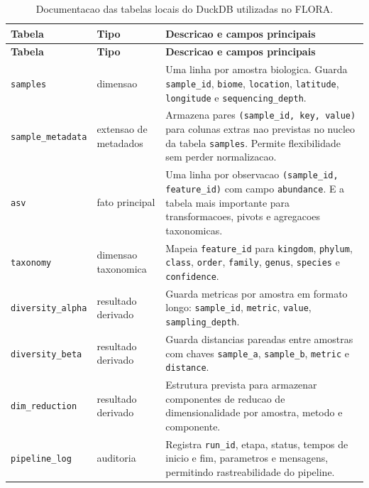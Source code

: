 \documentclass[12pt,a4paper]{article}
\begin{document}
\begin{longtable}{>{\raggedright\arraybackslash}p{3.2cm} >{\raggedright\arraybackslash}p{3.0cm} >{\raggedright\arraybackslash}p{7.8cm}}
    \caption{Documentacao das tabelas locais do DuckDB utilizadas no FLORA.}
    \label{tab:duckdb_tables}\\
    \toprule
    \textbf{Tabela} & \textbf{Tipo} & \textbf{Descricao e campos principais} \\
    \midrule
    \endfirsthead
    \toprule
    \textbf{Tabela} & \textbf{Tipo} & \textbf{Descricao e campos principais} \\
    \midrule
    \endhead
    \texttt{samples} & dimensao & Uma linha por amostra biologica. Guarda \texttt{sample\_id}, \texttt{biome}, \texttt{location}, \texttt{latitude}, \texttt{longitude} e \texttt{sequencing\_depth}. \\
    \texttt{sample\_metadata} & extensao de metadados & Armazena pares \texttt{(sample\_id, key, value)} para colunas extras nao previstas no nucleo da tabela \texttt{samples}. Permite flexibilidade sem perder normalizacao. \\
    \texttt{asv} & fato principal & Uma linha por observacao \texttt{(sample\_id, feature\_id)} com campo \texttt{abundance}. E a tabela mais importante para transformacoes, pivots e agregacoes taxonomicas. \\
    \texttt{taxonomy} & dimensao taxonomica & Mapeia \texttt{feature\_id} para \texttt{kingdom}, \texttt{phylum}, \texttt{class}, \texttt{order}, \texttt{family}, \texttt{genus}, \texttt{species} e \texttt{confidence}. \\
    \texttt{diversity\_alpha} & resultado derivado & Guarda metricas por amostra em formato longo: \texttt{sample\_id}, \texttt{metric}, \texttt{value}, \texttt{sampling\_depth}. \\
    \texttt{diversity\_beta} & resultado derivado & Guarda distancias pareadas entre amostras com chaves \texttt{sample\_a}, \texttt{sample\_b}, \texttt{metric} e \texttt{distance}. \\
    \texttt{dim\_reduction} & resultado derivado & Estrutura prevista para armazenar componentes de reducao de dimensionalidade por amostra, metodo e componente. \\
    \texttt{pipeline\_log} & auditoria & Registra \texttt{run\_id}, etapa, status, tempos de inicio e fim, parametros e mensagens, permitindo rastreabilidade do pipeline. \\
    \bottomrule
\end{longtable}
\end{document}
